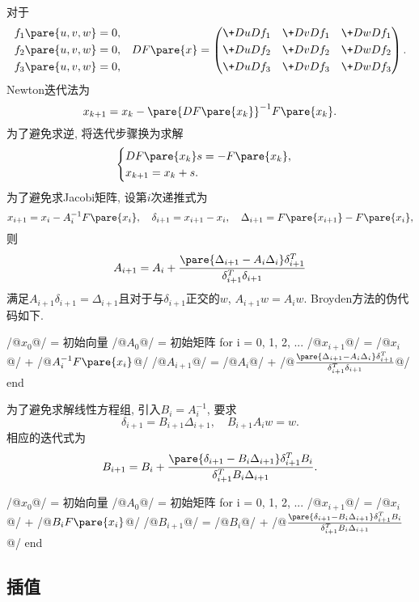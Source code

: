 \documentclass{ctexart}
\begin{document}
对于
\[ \begin{aligned}
    f_1\pare{u,v,w} & = 0, \\
    f_2\pare{u,v,w} & = 0, \\
    f_3\pare{u,v,w} & = 0,
\end{aligned}\quad DF\pare{x} = \left(\begin{aligned}
    \+DuD{f_1} && \+DvD{f_1} && \+DwD{f_1} \\
    \+DuD{f_2} && \+DvD{f_2} && \+DwD{f_2} \\
    \+DuD{f_3} && \+DvD{f_3} && \+DwD{f_3} \\
\end{aligned}\right). \]
Newton迭代法为
\[ x_{k+1} = x_k - \pare{DF\pare{x_k}}^{-1}F\pare{x_k}. \]
为了避免求逆, 将迭代步骤换为求解
\[ \begin{cases}
    DF\pare{x_k}s = -F\pare{x_k},\\
    x_{k+1} = x_k + s.
\end{cases} \]
为了避免求Jacobi矩阵, 设第$i$次递推式为
\[ x_{i+1} = x_i - A_i^{-1}F\pare{x_i},\quad \delta_{i+1} = x_{i+1} - x_i,\quad \Delta_{i+1} = F\pare{x_{i+1}} - F\pare{x_i}, \]
则
\[ A_{i+1} = A_i + \frac{\pare{\Delta_{i+1} - A_i\Delta_i}\delta^T_{i+1}}{\delta_{i+1}^T\delta_{i+1}} \]
满足$A_{i+1}\delta_{i+1} = \Delta_{i+1}$且对于与$\delta_{i+1}$正交的$w$, $A_{i+1}w = A_iw$. Broyden方法的伪代码如下.
\begin{matlablst}
/@$x_0$@/ = 初始向量
/@$A_0$@/ = 初始矩阵
for i = 0, 1, 2, ...
    /@$x_{i+1}$@/ = /@$x_i$@/ + /@$A_i^{-1}F\pare{x_i}$@/
    /@$A_{i+1}$@/ = /@$A_i$@/ + /@$\frac{\pare{\Delta_{i+1} - A_i\Delta_i}\delta^T_{i+1}}{\delta_{i+1}^T\delta_{i+1}}$@/
end
\end{matlablst}
为了避免求解线性方程组, 引入$B_i=A_i^{-1}$, 要求
\[ \delta_{i+1} = B_{i+1}\Delta_{i+1},\quad B_{i+1}A_iw = w. \]
相应的迭代式为
\[ B_{i+1} = B_i + \frac{\pare{\delta_{i+1} - B_i\Delta_{i+1}}\delta_{i+1}^TB_i}{\delta_{i+1}^TB_i\Delta_{i+1}}. \]
\begin{matlablst}
/@$x_0$@/ = 初始向量
/@$A_0$@/ = 初始矩阵
for i = 0, 1, 2, ...
    /@$x_{i+1}$@/ = /@$x_i$@/ + /@$B_iF\pare{x_i}$@/
    /@$B_{i+1}$@/ = /@$B_i$@/ + /@$\frac{\pare{\delta_{i+1} - B_i\Delta_{i+1}}\delta_{i+1}^TB_i}{\delta_{i+1}^TB_i\Delta_{i+1}}$@/
end
\end{matlablst}



\subsection{插值} %
\label{sub:插值}
\end{document}
